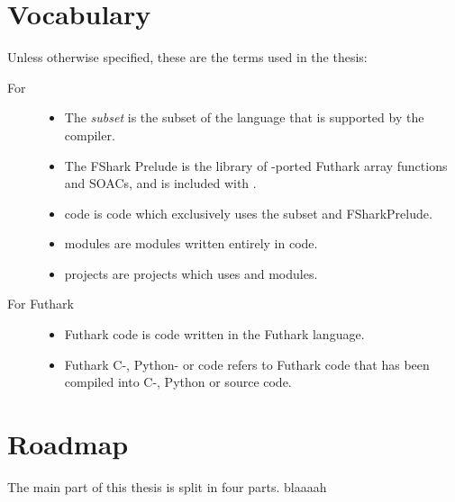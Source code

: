 \section{Vocabulary}
Unless otherwise specified, these are the terms used in the thesis:
\begin{description}
\item[For \fshark{}]\hfill
  \begin{itemize}
  \item The \fshark{} \textit{subset} is the subset of the \fsharp{} language
    that is supported by the \fshark{} compiler.

  \item The FShark Prelude is the library of \fsharp{}-ported Futhark array
    functions and SOACs, and is included with \fshark{}.

  \item \fshark{} code is \fsharp{} code which exclusively uses the \fshark{}
    subset and FSharkPrelude.

  \item \fshark{} modules are \fsharp{} modules written entirely in \fshark{}
    code.
    
  \item \fshark{} projects are \fsharp{} projects which uses \fshark{} and
    \fshark{} modules.
    \\
  \end{itemize}

\item[For Futhark]\hfill
  \begin{itemize}

  \item Futhark code is code written in the Futhark language.

  \item Futhark C-, Python- or \csharp{} code refers to Futhark code that has been compiled
    into C-, Python or \csharp{} source code.

  \end{itemize}
\end{description}



\section{Roadmap}
The main part of this thesis is split in four parts.
blaaaah


